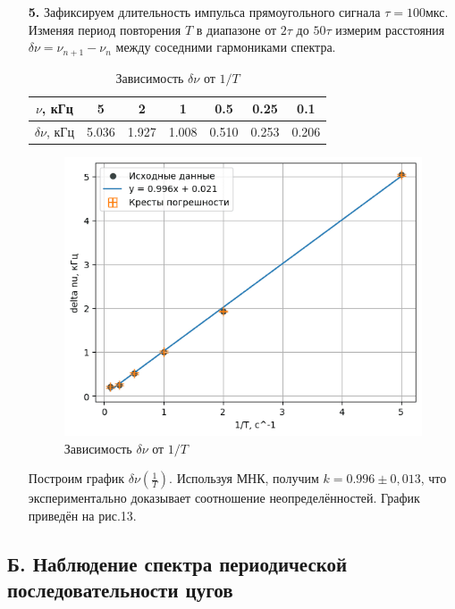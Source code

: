 \documentclass[a4paper,12pt]{article}
\begin{document}
\begin{enumerate}
\item[\textbf{5.}]
Зафиксируем длительность импульса прямоугольного сигнала $\tau = 100 \text{мкс}$. Изменяя период повторения $T$ в диапазоне от $2\tau$ до $50\tau$ измерим расстояния $\delta\nu = \nu_{n+1} - \nu_n$ между соседними гармониками спектра.
\begin{table}[h!]
    \centering
    \begin{tabular}{|c|c|c|c|c|c|c|}
\hline
$\nu$, кГц & 5 & 2 & 1 & 0.5 & 0.25 & 0.1 \\ \hline
$\delta \nu$, кГц & 5.036 & 1.927 & 1.008 & 0.510 & 0.253 & 0.206 \\ \hline
\end{tabular}
    \caption{Зависимость $\delta \nu$ от $1/T$}
    \label{table3}
\end{table}

\newpage

\begin{figure}[h]
    \centering
    \includegraphics[width=0.7\linewidth]{grafic2.png}
    \caption{Зависимость $\delta \nu$ от $1/T$}
    \label{grafic2}
\end{figure}
Построим график $\delta\nu\left(\frac{1}{T}\right)$. Используя МНК, получим $k=0.996\pm0,013$, что экспериментально доказывает соотношение неопределённостей. График приведён на рис.13.
\end{enumerate}


\newpage

\subsection*{Б. Наблюдение спектра периодической последовательности цугов}
\end{document}
